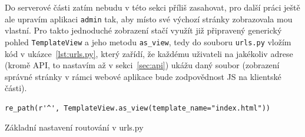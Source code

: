     Do serverové části zatím nebudu v této sekci příliš zasahovat, pro další práci ještě ale upravím aplikaci \verb|admin| tak, aby místo své výchozí stránky zobrazovala mou vlastní. Pro takto jednoduché zobrazení stačí využít již připravený generický pohled \verb|TemplateView| a jeho metodu \verb|as_view|, tedy do souboru \verb|urls.py| vložím kód v ukázce~\ref{lst:urls.py}, který zařídí, že každému uživateli na jakékoliv adrese (kromě API, to nastavím až v sekci~\ref{sec:api}) ukážu daný soubor (zobrazení správné stránky v rámci webové aplikace bude zodpovědnost JS na klientské části).
    
    \begin{listing}[ht]
    	\begin{verbatim}
re_path(r'^', TemplateView.as_view(template_name="index.html"))
    	\end{verbatim}
    	\caption{Základní nastavení routování v urls.py}\label{lst:urls.py}
    \end{listing}
    
